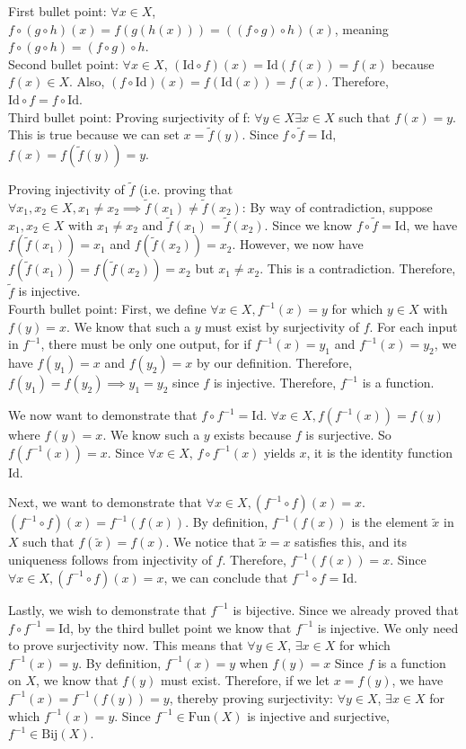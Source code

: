 \documentclass{amsart}
\begin{document}
\begin{enumerate}[itemsep=0.4in]
First bullet point: $\forall x\in X$, $f\circ(g\circ h)(x)=f(g(h(x)))=((f\circ g)\circ h)(x)$, meaning $f\circ(g\circ h)=(f\circ g)\circ h$.\\

Second bullet point: $\forall x\in X$, $(\mathrm{Id}\circ f)(x)=\mathrm{Id}(f(x))=f(x)$ because $f(x)\in X$. Also, $(f\circ\mathrm{Id})(x)=f(\mathrm{Id}(x))=f(x)$. Therefore, $\mathrm{Id}\circ f=f\circ\mathrm{Id}$.\\

Third bullet point: Proving surjectivity of f: $\forall y\in X\exists x\in X$ such that $f(x)=y$. This is true because we can set $x=\tilde f(y)$. Since $f\circ\tilde f=\mathrm{Id}$, $f(x)=f(\tilde f(y))=y$.

Proving injectivity of $\tilde f$ (i.e. proving that $\forall x_1,x_2\in X,x_1\neq x_2\implies\tilde f(x_1)\neq\tilde f(x_2)$: By way of contradiction, suppose $x_1,x_2\in X$ with $x_1\neq x_2$ and $\tilde f(x_1)=\tilde f(x_2)$. Since we know $f\circ\tilde f=\mathrm{Id}$, we have $f(\tilde f(x_1))=x_1$ and $f(\tilde f(x_2))=x_2$. However, we now have $f(\tilde f(x_1))=f(\tilde f(x_2))=x_2$ but $x_1\neq x_2$. This is a contradiction. Therefore, $\tilde f$ is injective.\\

Fourth bullet point: First, we define $\forall x\in X,f^{-1}(x)=y$ for which $y\in X$ with $f(y)=x$. We know that such a $y$ must exist by surjectivity of $f$. For each input in $f^{-1}$, there must be only one output, for if $f^{-1}(x)=y_1$ and $f^{-1}(x)=y_2$, we have $f(y_1)=x$ and $f(y_2)=x$ by our definition. Therefore, $f(y_1)=f(y_2)\implies y_1=y_2$ since $f$ is injective. Therefore, $f^{-1}$ is a function. 

We now want to demonstrate that $f\circ f^{-1}=\mathrm{Id}$. $\forall x\in X,f(f^{-1}(x))=f(y)$ where $f(y)=x$. We know such a $y$ exists because $f$ is surjective. So $f(f^{-1}(x))=x$. Since $\forall x\in X$, $f\circ f^{-1}(x)$ yields $x$, it is the identity function $\mathrm{Id}$.

Next, we want to demonstrate that $\forall x\in X,(f^{-1}\circ f)(x)=x$. $(f^{-1}\circ f)(x)=f^{-1}(f(x))$. By definition, $f^{-1}(f(x))$ is the element $\tilde x$ in $X$ such that $f(\tilde x)=f(x)$. We notice that $\tilde x=x$ satisfies this, and its uniqueness follows from injectivity of $f$. Therefore, $f^{-1}(f(x))=x$. Since $\forall x\in X,(f^{-1}\circ f)(x)=x$, we can conclude that $f^{-1}\circ f=\mathrm{Id}$. 

Lastly, we wish to demonstrate that $f^{-1}$ is bijective. Since we already proved that $f\circ f^{-1}=\mathrm{Id}$, by the third bullet point we know that $f^{-1}$ is injective. We only need to prove surjectivity now. This means that $\forall y\in X$, $\exists x\in X$ for which $f^{-1}(x)=y$. By definition, $f^{-1}(x)=y$ when $f(y)=x$ Since $f$ is a function on $X$, we know that $f(y)$ must exist. Therefore, if we let $x=f(y)$, we have $f^{-1}(x)=f^{-1}(f(y))=y$, thereby proving surjectivity: $\forall y\in X$, $\exists x\in X$ for which $f^{-1}(x)=y$. Since $f^{-1}\in\mathrm{Fun}(X)$ is injective and surjective, $f^{-1}\in\mathrm{Bij}(X)$.


\end{enumerate}
\end{document}
